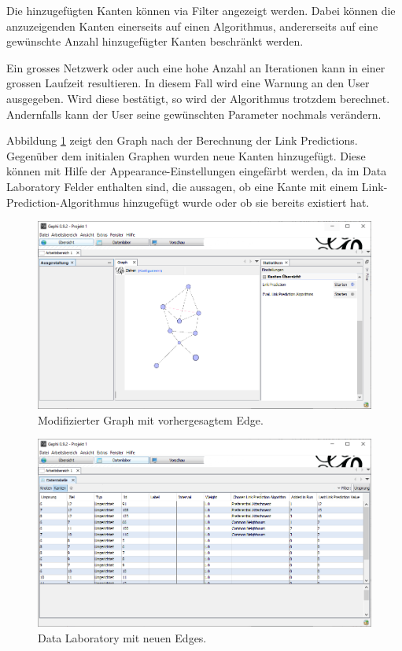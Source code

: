 Die hinzugefügten Kanten können via Filter angezeigt werden. Dabei können die anzuzeigenden Kanten einerseits auf einen Algorithmus, andererseits auf eine gewünschte Anzahl hinzugefügter Kanten beschränkt werden.


Ein grosses Netzwerk oder auch eine hohe Anzahl an Iterationen kann in einer grossen Laufzeit resultieren.
In diesem Fall wird eine Warnung an den User ausgegeben. Wird diese bestätigt, so wird der Algorithmus trotzdem berechnet. Andernfalls kann der User seine gewünschten
Parameter nochmals verändern.

Abbildung \ref{fig:screen3} zeigt den Graph nach der Berechnung der Link Predictions.
Gegenüber dem initialen Graphen wurden neue Kanten hinzugefügt.
Diese können mit Hilfe der Appearance-Einstellungen eingefärbt werden, da im Data Laboratory Felder enthalten sind, die aussagen, ob eine
Kante mit einem Link-Prediction-Algorithmus hinzugefügt wurde oder ob sie bereits existiert hat.

\begin{figure}
    \includegraphics[width=\linewidth]{resources/sc3.png}
    \caption{Modifizierter Graph mit vorhergesagtem Edge.}
    \label{fig:screen3}
\end{figure}

\begin{figure}
    \includegraphics[width=\linewidth]{resources/sc4.png}
    \caption{Data Laboratory mit neuen Edges.}
    \label{fig:screen4}
\end{figure}

